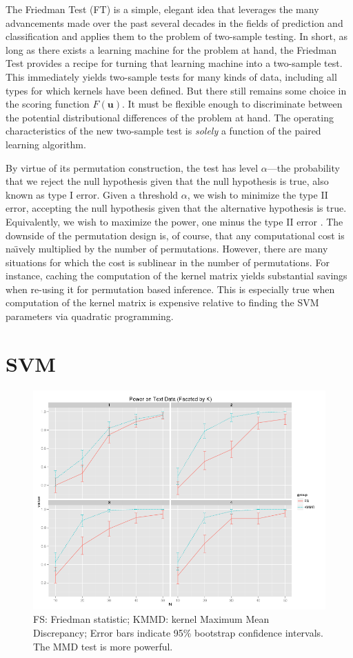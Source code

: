 The Friedman Test (FT) is a simple, elegant idea that leverages the
many advancements made over the past several decades in the fields of
prediction and classification and applies them to the problem of
two-sample testing.  In short, as long as there exists a learning
machine for the problem at hand, the Friedman Test provides a recipe
for turning that learning machine into a two-sample test.  This
immediately yields two-sample tests for many kinds of data, including
all types for which kernels have been defined.
But there still remains some choice in the scoring
function $F(\mathbf{u})$.  It must be flexible enough to discriminate
between the potential distributional differences of the problem at
hand.  The operating characteristics of the new two-sample test is
\emph{solely} a function of the paired learning algorithm.

By virtue of its permutation construction, the test has level $\alpha$---the
probability that we reject the null hypothesis given
that the null hypothesis is true, also known as type I error.  Given a
threshold $\alpha$, we wish to minimize the type II error, accepting
the null hypothesis given that the alternative hypothesis is true.
Equivalently, we wish to maximize the power, one minus the type II
error \cite{lehmann2005testing}.  The downside of the permutation
design is, of course, that any computational cost is na\"\i vely
multiplied by the number of permutations.  However, there are many
situations for which the cost is sublinear in the number of
permutations.  For instance, caching the computation of the kernel matrix
yields substantial savings when re-using it for permutation based
inference.  This is especially true when computation of the kernel
matrix is expensive relative to finding the SVM parameters via
quadratic programming.

\section{SVM}
\begin{figure}
  \centering
  \includegraphics[width=\linewidth]{power_string.png}
  \caption{FS: Friedman statistic; KMMD: kernel Maximum Mean
    Discrepancy; Error bars indicate 95\% bootstrap confidence
    intervals.  The MMD test is more powerful.}
  \label{fig:power_string}
\end{figure}

